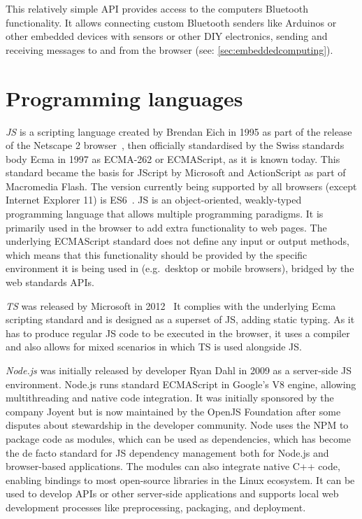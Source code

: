 This relatively simple \ac{API} provides access to the computer\textquotesingle s Bluetooth functionality.
It allows connecting custom Bluetooth senders like Arduinos or other embedded devices with sensors or other \ac{DIY} electronics, sending and receiving messages to and from the browser (see: \autoref{sec:embeddedcomputing}).

\section{Programming languages}
\label{sec:programming-languages}



\emph{\ac{JS}} is a scripting language created by Brendan Eich in 1995 as part of the release of the Netscape 2 browser~\parencite{javascriptRelease}, then officially standardised by the Swiss standards body Ecma in 1997 as ECMA-262 or ECMAScript, as it is known today.
This standard became the basis for JScript by Microsoft and ActionScript as part of Macromedia Flash.
The version currently being supported by all browsers (except Internet Explorer 11) is \ac{ES6}~\parencite{javascriptHistory}.
\ac{JS} is an object-oriented, weakly-typed programming language that allows multiple programming paradigms.
It is primarily used in the browser to add extra functionality to web pages.
The underlying ECMAScript standard does not define any input or output methods, which means that this functionality should be provided by the specific environment it is being used in (e.g.\ desktop or mobile browsers), bridged by the web standards \ac{API}s.

\emph{\ac{TS}} was released by Microsoft in 2012~ It complies with the underlying Ecma scripting standard and is designed as a superset of \ac{JS}, adding static typing.
As it has to produce regular \ac{JS} code to be executed in the browser, it uses a compiler and also allows for mixed scenarios in which \ac{TS} is used alongside \ac{JS}.

\emph{Node.js} was initially released by developer Ryan Dahl in 2009 as a server-side \ac{JS} environment.
Node.js runs standard ECMAScript in Google's V8 engine, allowing multithreading and native code integration.
It was initially sponsored by the company Joyent but is now maintained by the OpenJS Foundation after some disputes about stewardship in the developer community.
Node uses the \ac{NPM} to package code as modules, which can be used as dependencies, which has become the de facto standard for \ac{JS} dependency management both for Node.js and browser-based applications.
The modules can also integrate native C++ code, enabling bindings to most open-source libraries in the Linux ecosystem.
It can be used to develop \ac{API}s or other server-side applications and supports local web development processes like preprocessing, packaging, and deployment.

